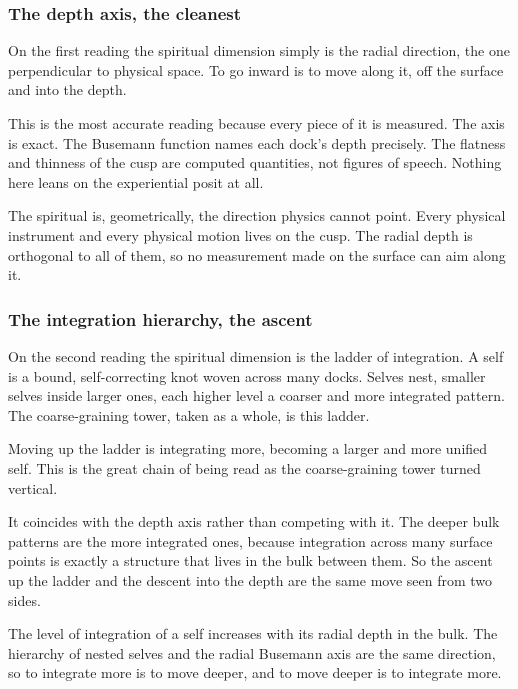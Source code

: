 \subsubsection{The depth axis, the cleanest}

On the first reading the spiritual dimension simply is the radial direction, the one perpendicular to physical space. To go inward is to move along it, off the surface and into the depth.

This is the most accurate reading because every piece of it is measured. The axis is exact. The Busemann function names each dock's depth precisely. The flatness and thinness of the cusp are computed quantities, not figures of speech. Nothing here leans on the experiential posit at all.

\begin{principle}
The spiritual is, geometrically, the direction physics cannot point. Every physical instrument and every physical motion lives on the cusp. The radial depth is orthogonal to all of them, so no measurement made on the surface can aim along it.
\end{principle}

\subsubsection{The integration hierarchy, the ascent}

On the second reading the spiritual dimension is the ladder of integration. A self is a bound, self-correcting knot woven across many docks. Selves nest, smaller selves inside larger ones, each higher level a coarser and more integrated pattern. The coarse-graining tower, taken as a whole, is this ladder.

Moving up the ladder is integrating more, becoming a larger and more unified self. This is the great chain of being read as the coarse-graining tower turned vertical.

It coincides with the depth axis rather than competing with it. The deeper bulk patterns are the more integrated ones, because integration across many surface points is exactly a structure that lives in the bulk between them. So the ascent up the ladder and the descent into the depth are the same move seen from two sides.

\begin{proposition}
The level of integration of a self increases with its radial depth in the bulk. The hierarchy of nested selves and the radial Busemann axis are the same direction, so to integrate more is to move deeper, and to move deeper is to integrate more.
\end{proposition}

